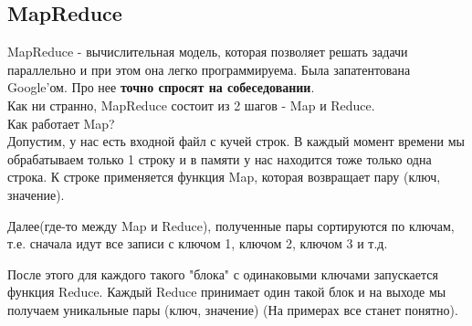 \documentclass{article}
\begin{document}
\subsection{MapReduce}

MapReduce - вычислительная модель, которая позволяет решать задачи параллельно и при этом она легко программируема. Была запатентована Google'ом. Про нее \textbf{точно спросят на собеседовании}.\\

Как ни странно, MapReduce состоит из 2 шагов - Map и Reduce.\\

Как работает Map?\\

Допустим, у нас есть входной файл с кучей строк. В каждый момент времени мы обрабатываем только 1 строку и в памяти у нас находится тоже только одна строка. К строке применяется функция Map, которая возвращает пару (ключ, значение).

Далее(где-то между Map и Reduce), полученные пары сортируются по ключам, т.е. сначала идут все записи с ключом 1, ключом 2, ключом 3 и т.д.

После этого для каждого такого "блока" с одинаковыми ключами запускается функция Reduce. Каждый Reduce принимает один такой блок и на выходе мы получаем уникальные пары (ключ, значение) (На примерах все станет понятно).
\end{document}
